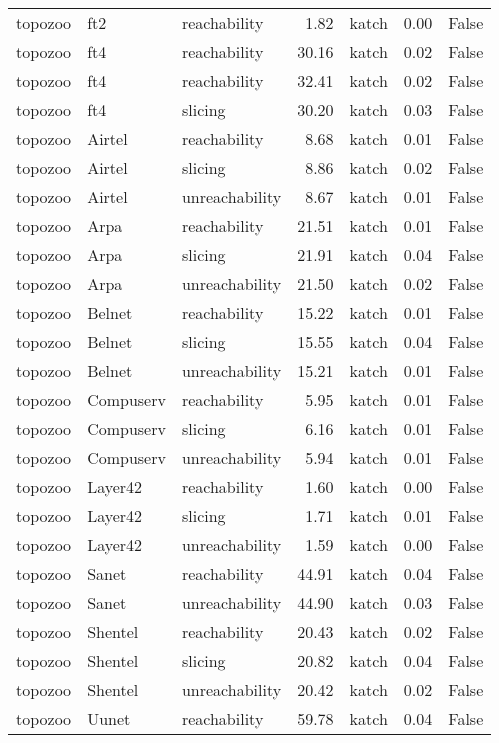\begin{tabular}{lllrlrr}
topozoo & ft2 & reachability & 1.82 & katch & 0.00 & False \\
topozoo & ft4 & reachability & 30.16 & katch & 0.02 & False \\
topozoo & ft4 & reachability & 32.41 & katch & 0.02 & False \\
topozoo & ft4 & slicing & 30.20 & katch & 0.03 & False \\
topozoo & Airtel & reachability & 8.68 & katch & 0.01 & False \\
topozoo & Airtel & slicing & 8.86 & katch & 0.02 & False \\
topozoo & Airtel & unreachability & 8.67 & katch & 0.01 & False \\
topozoo & Arpa & reachability & 21.51 & katch & 0.01 & False \\
topozoo & Arpa & slicing & 21.91 & katch & 0.04 & False \\
topozoo & Arpa & unreachability & 21.50 & katch & 0.02 & False \\
topozoo & Belnet & reachability & 15.22 & katch & 0.01 & False \\
topozoo & Belnet & slicing & 15.55 & katch & 0.04 & False \\
topozoo & Belnet & unreachability & 15.21 & katch & 0.01 & False \\
topozoo & Compuserv & reachability & 5.95 & katch & 0.01 & False \\
topozoo & Compuserv & slicing & 6.16 & katch & 0.01 & False \\
topozoo & Compuserv & unreachability & 5.94 & katch & 0.01 & False \\
topozoo & Layer42 & reachability & 1.60 & katch & 0.00 & False \\
topozoo & Layer42 & slicing & 1.71 & katch & 0.01 & False \\
topozoo & Layer42 & unreachability & 1.59 & katch & 0.00 & False \\
topozoo & Sanet & reachability & 44.91 & katch & 0.04 & False \\
topozoo & Sanet & unreachability & 44.90 & katch & 0.03 & False \\
topozoo & Shentel & reachability & 20.43 & katch & 0.02 & False \\
topozoo & Shentel & slicing & 20.82 & katch & 0.04 & False \\
topozoo & Shentel & unreachability & 20.42 & katch & 0.02 & False \\
topozoo & Uunet & reachability & 59.78 & katch & 0.04 & False \\

\end{tabular}
